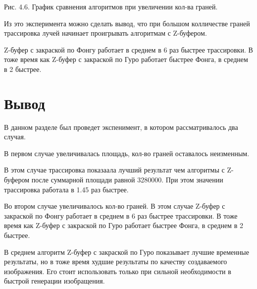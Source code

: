 \documentclass[12pt]{report}
\begin{document}
	\begin{center}
		\begin{center}
		\end{center}
		Рис. 4.6. График сравнения алгоритмов при увеличении кол-ва граней.
	\end{center}

	Из это эксперимента можно сделать вывод, что при большом колличестве граней трассировка лучей начинает проигрывать алгоритмам с Z-буфером.
	
	Z-буфер с закраской по Фонгу работает в среднем в 6 раз быстрее трассировки.
	В тоже время как Z-буфер с закраской по Гуро работает быстрее Фонга, в среднем в 2 быстрее.
	
	\section*{Вывод}
	
	В данном разделе был проведет экспенимент, в котором рассматривалось два случая.
	
	В первом случае увеличивалась площадь, кол-во граней оставалось неизменным.
	
	В этом случае трассировка показаала лучший результат чем алгоритмы с Z-буфером после суммарной площади равной 3280000. При этом значении трассировка работала в 1.45 раз быстрее.
	
	Во втором случае увеличивалось кол-во граней. В этом случае Z-буфер с закраской по Фонгу работает в среднем в 6 раз быстрее трассировки.
	В тоже время как Z-буфер с закраской по Гуро работает быстрее Фонга, в среднем в 2 быстрее.
	
	В среднем алгоритм Z-буфер с закраской по Гуро показывает лучшие временные результаты, но в тоже время худшие результаты по качеству создаваемого изображения. Его стоит использовать только при сильной необходимости в быстрой генерации изобращения.
	
\end{document}
